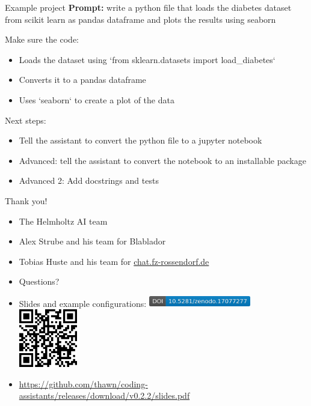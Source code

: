 \documentclass[
  aspectratio=1610,
]{beamer}
\begin{document}
\begin{frame}{Example project}
  \textbf{Prompt:} write a python file that loads the diabetes dataset from scikit learn as pandas dataframe and plots the results using seaborn

  Make sure the code:
  \begin{itemize}
    \item Loads the dataset using `from sklearn.datasets import load\_diabetes`
    \item Converts it to a pandas dataframe
    \item Uses `seaborn` to create a plot of the data
  \end{itemize}
  Next steps:
  \begin{itemize}
    \item Tell the assistant to convert the python file to a jupyter notebook
    \item Advanced: tell the assistant to convert the notebook to an installable package
    \item Advanced 2: Add docstrings and tests
  \end{itemize}
\end{frame}


\begin{frame}{Thank you!}
  \begin{itemize}
    \item The Helmholtz AI team
    \item Alex Strube and his team for Blablador
    \item Tobias Huste and his team for \href{https://chat.fz-rossendorf.de}{chat.fz-rossendorf.de}
    \item Questions?
    \item Slides and example configurations:  \href{https://doi.org/10.5281/zenodo.17077276}{\includegraphics[width=0.35\textwidth]{images/zenodo.png}}\\ \href{https://doi.org/10.5281/zenodo.17077276}{\includegraphics[width=0.2\textwidth]{images/barcode.eps}}
    \item \href{https://github.com/thawn/coding-assistants/releases/download/v0.2.2/slides.pdf}{https://github.com/thawn/coding-assistants/releases/download/v0.2.2/slides.pdf}
  \end{itemize}

\end{frame}
\end{document}
